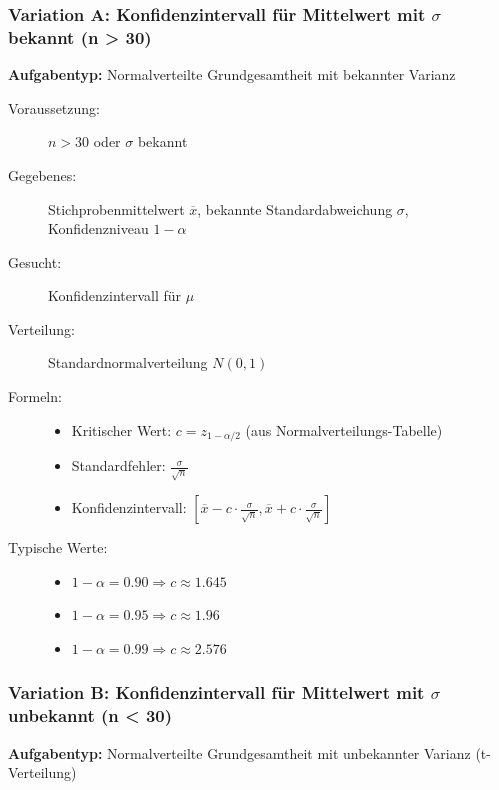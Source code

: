 \documentclass[12pt, a4paper, titlepage, ngerman]{scrartcl}
\begin{document}
\subsubsection{Variation A: Konfidenzintervall für Mittelwert mit $\sigma$ bekannt (n > 30)}

\textbf{Aufgabentyp:} Normalverteilte Grundgesamtheit mit bekannter Varianz

\begin{description}
  \item[Voraussetzung:] $n > 30$ oder $\sigma$ bekannt
  \item[Gegebenes:] Stichprobenmittelwert $\overline{x}$, bekannte Standardabweichung $\sigma$, Konfidenzniveau $1 - \alpha$
  \item[Gesucht:] Konfidenzintervall für $\mu$
  \item[Verteilung:] Standardnormalverteilung $N(0,1)$
  \item[Formeln:] 
    \begin{itemize}
      \item Kritischer Wert: $c = z_{1 - \alpha/2}$ (aus Normalverteilungs-Tabelle)
      \item Standardfehler: $\frac{\sigma}{\sqrt{n}}$
      \item Konfidenzintervall: $\left[\overline{x} - c \cdot \frac{\sigma}{\sqrt{n}}, \overline{x} + c \cdot \frac{\sigma}{\sqrt{n}}\right]$
    \end{itemize}
  \item[Typische Werte:] 
    \begin{itemize}
      \item $1 - \alpha = 0.90 \Rightarrow c \approx 1.645$
      \item $1 - \alpha = 0.95 \Rightarrow c \approx 1.96$
      \item $1 - \alpha = 0.99 \Rightarrow c \approx 2.576$
    \end{itemize}
\end{description}

\subsubsection{Variation B: Konfidenzintervall für Mittelwert mit $\sigma$ unbekannt (n < 30)}

\textbf{Aufgabentyp:} Normalverteilte Grundgesamtheit mit unbekannter Varianz (t-Verteilung)
\end{document}
